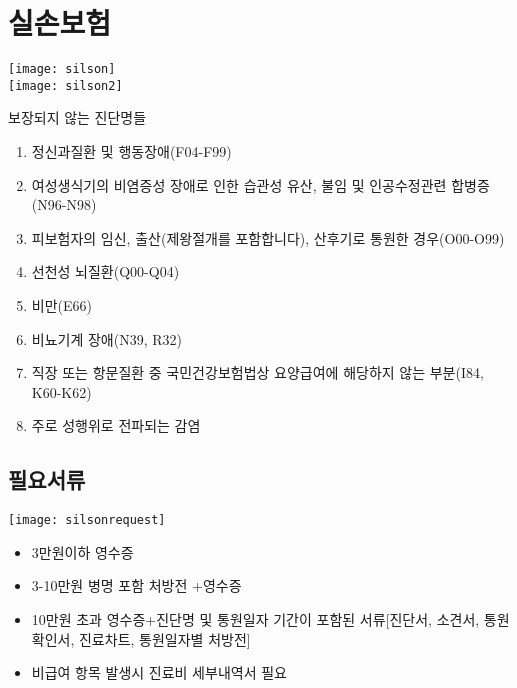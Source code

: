 \section{실손보험}
\texttt{[image: silson]}\\
\texttt{[image: silson2]}\\
\begin{hemphsentense}{보장되지 않는 진단명들}
\begin{enumerate}\tightlist
\item 정신과질환 및 행동장애(F04-F99)
\item 여성생식기의 비염증성 장애로 인한 습관성 유산, 불임 및 인공수정관련 합병증(N96-N98)
\item 피보험자의 임신, 출산(제왕절개를 포함합니다), 산후기로 통원한 경우(O00-O99)
\item 선천성 뇌질환(Q00-Q04)
\item 비만(E66)
\item 비뇨기계 장애(N39, R32)
\item 직장 또는 항문질환 중 국민건강보험법상 요양급여에 해당하지 않는 부분(I84, K60-K62)
\item 주로 성행위로 전파되는 감염
\end{enumerate}
\end{hemphsentense}

\subsection{필요서류}
\texttt{[image: silsonrequest]}\\


\begin{mdframed}[linecolor=blue,middlelinewidth=2]
\begin{itemize}\tightlist
\item 3만원이하 \MVRightarrow 영수증
\item 3-10만원 \MVRightarrow 병명 포함 처방전 +영수증
\item 10만원 초과 \MVRightarrow 영수증+진단명 및 통원일자 기간이 포함된 서류[진단서, 소견서, 
		통원확인서, 진료차트, 통원일자별 처방전]
\item 비급여 항목 발생시 진료비 세부내역서 필요
\end{itemize}
\end{mdframed}

